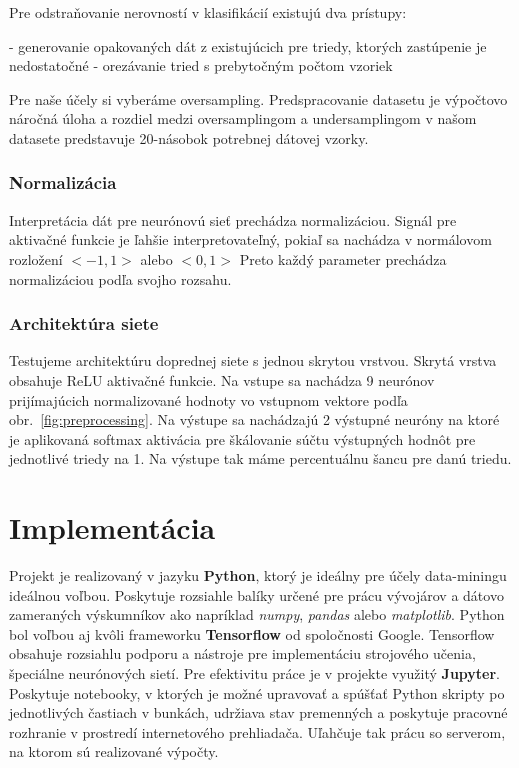 Pre odstraňovanie nerovností v klasifikácií existujú dva prístupy:
\begin{my_itemize}
	 - generovanie opakovaných dát z existujúcich pre triedy, ktorých zastúpenie je nedostatočné
	 - orezávanie tried s prebytočným počtom vzoriek
\end{my_itemize}

Pre naše účely si vyberáme oversampling. Predspracovanie datasetu je výpočtovo náročná úloha a rozdiel medzi oversamplingom a undersamplingom v našom datasete predstavuje 20-násobok potrebnej dátovej vzorky.


\subsubsection{Normalizácia}
Interpretácia dát pre neurónovú sieť prechádza normalizáciou. Signál pre aktivačné funkcie je ľahšie interpretovateľný, pokiaľ sa nachádza v normálovom rozložení $<-1,1>$ alebo $<0,1>$ Preto každý parameter prechádza normalizáciou podľa svojho rozsahu.

\subsubsection{Architektúra siete}
Testujeme architektúru doprednej siete s jednou skrytou vrstvou. Skrytá vrstva obsahuje ReLU aktivačné funkcie. Na vstupe sa nachádza 9 neurónov prijímajúcich normalizované hodnoty vo vstupnom vektore podľa obr.~\ref{fig:preprocessing}. Na výstupe sa nachádzajú 2 výstupné neuróny na ktoré je aplikovaná softmax aktivácia pre škálovanie súčtu výstupných hodnôt pre jednotlivé triedy na 1. Na výstupe tak máme percentuálnu šancu pre danú triedu. \newline


\section{Implementácia}
\label{implementation}

Projekt je realizovaný v jazyku \textbf{Python}, ktorý je ideálny pre účely data-miningu ideálnou voľbou. Poskytuje rozsiahle balíky určené pre prácu vývojárov a dátovo zameraných výskumníkov ako napríklad \textit{numpy}, \textit{pandas} alebo \textit{matplotlib}. \newline
Python bol voľbou aj kvôli frameworku \textbf{Tensorflow} od spoločnosti Google. Tensorflow obsahuje rozsiahlu podporu a nástroje pre implementáciu strojového učenia, špeciálne neurónových sietí.\newline
Pre efektivitu práce je v projekte využitý \textbf{Jupyter}. Poskytuje notebooky, v ktorých je možné upravovať a spúšťať Python skripty po jednotlivých častiach v bunkách, udržiava stav premenných a poskytuje pracovné rozhranie v prostredí internetového prehliadača. Uľahčuje tak prácu so serverom, na ktorom sú realizované výpočty.